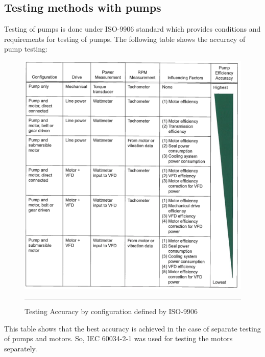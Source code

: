 \subsection{Testing methods with pumps}
Testing of pumps is done under ISO-9906 standard which provides conditions and requirements for testing of pumps. The following table shows the accuracy of pump testing:
\begin{figure}[htbp]
	\centering
		\includegraphics[width = 5.5in]{./Figures/MS/25.png}
		\rule{35em}{0.5pt}
	\caption{Testing Accuracy by configuration defined by ISO-9906\cite{iso9906}}
	\label{fig:Testing Accuracy by configuration defined by ISO-9906}
\end{figure}
This table shows that the best accuracy is achieved in the case of separate testing of pumps and motors. So, IEC 60034-2-1 was used for testing the motors separately.